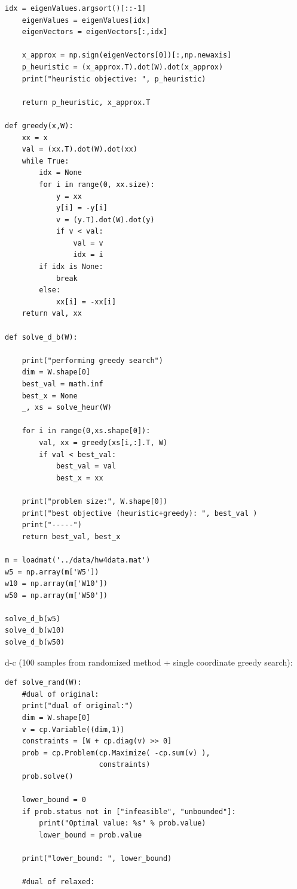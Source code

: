 \documentclass[12pt,letter]{article}
\begin{document}
\begin{enumerate}
\begin{enumerate}
\begin{itemize}
\begin{Verbatim}[fontsize=\small]
    idx = eigenValues.argsort()[::-1]
    eigenValues = eigenValues[idx]
    eigenVectors = eigenVectors[:,idx]
    
    x_approx = np.sign(eigenVectors[0])[:,np.newaxis]
    p_heuristic = (x_approx.T).dot(W).dot(x_approx)
    print("heuristic objective: ", p_heuristic)

    return p_heuristic, x_approx.T
    
def greedy(x,W):
    xx = x
    val = (xx.T).dot(W).dot(xx)
    while True:
        idx = None
        for i in range(0, xx.size):
            y = xx
            y[i] = -y[i]
            v = (y.T).dot(W).dot(y)
            if v < val:
                val = v
                idx = i
        if idx is None:
            break
        else:
            xx[i] = -xx[i]
    return val, xx

def solve_d_b(W):
    
    print("performing greedy search")
    dim = W.shape[0]
    best_val = math.inf
    best_x = None
    _, xs = solve_heur(W)
    
    for i in range(0,xs.shape[0]):
        val, xx = greedy(xs[i,:].T, W)
        if val < best_val:
            best_val = val
            best_x = xx
            
    print("problem size:", W.shape[0])
    print("best objective (heuristic+greedy): ", best_val )
    print("-----")
    return best_val, best_x

m = loadmat('../data/hw4data.mat')
w5 = np.array(m['W5'])
w10 = np.array(m['W10'])
w50 = np.array(m['W50'])

solve_d_b(w5)
solve_d_b(w10)
solve_d_b(w50)
\end{Verbatim}
      
      \pagebreak
      
      d-c (100 samples from randomized method + single coordinate greedy search):
\begin{Verbatim}[fontsize=\small]
def solve_rand(W):  
    #dual of original:
    print("dual of original:")
    dim = W.shape[0]
    v = cp.Variable((dim,1))
    constraints = [W + cp.diag(v) >> 0]
    prob = cp.Problem(cp.Maximize( -cp.sum(v) ),
                      constraints)
    prob.solve()
    
    lower_bound = 0
    if prob.status not in ["infeasible", "unbounded"]:
        print("Optimal value: %s" % prob.value)
        lower_bound = prob.value

    print("lower_bound: ", lower_bound)

    #dual of relaxed:


\end{Verbatim}
\end{itemize}
\end{enumerate}
\end{enumerate}
\end{document}
